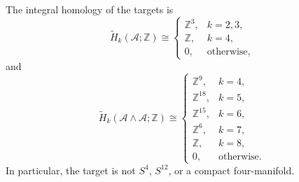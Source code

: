 \begin{theorem}
The integral homology of the targets is
\begin{equation}
 \widetilde H_k(\mathcal A;\mathbb Z)\cong
 \begin{cases}
  \mathbb Z^3,&k=2,3,\\
  \mathbb Z,&k=4,\\
  0,&\text{otherwise},
 \end{cases}
 \label{cusp-cone-A-homology}
\end{equation}
and
\begin{equation}
 \widetilde H_k(\mathcal A\wedge\mathcal A;\mathbb Z)\cong
 \begin{cases}
  \mathbb Z^9,&k=4,\\
  \mathbb Z^{18},&k=5,\\
  \mathbb Z^{15},&k=6,\\
  \mathbb Z^6,&k=7,\\
  \mathbb Z,&k=8,\\
  0,&\text{otherwise}.
 \end{cases}
 \label{cusp-cone-A-smash-homology}
\end{equation}
In particular, the target is not \(S^4\), \(S^{12}\), or a compact
four-manifold.
\end{theorem}

